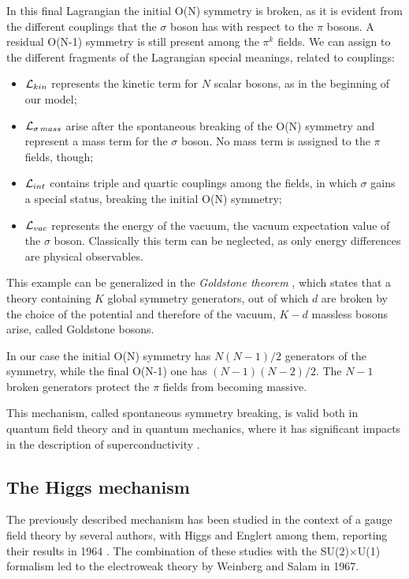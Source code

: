 In this final Lagrangian the initial O(N) symmetry is broken, as it is evident from the different couplings that the $\sigma$ boson has with respect to the $\pi$ bosons. A residual O(N-1) symmetry is still present among the $\pi^k$ fields.
We can assign to the different fragments of the Lagrangian special meanings, related to couplings:
\begin{itemize}
\item $\mathcal{L}_{kin}$ represents the kinetic term for $N$ scalar bosons, as in the beginning of our model;
\item $\mathcal{L}_{\sigma \, mass}$ arise after the spontaneous breaking of the O(N) symmetry and represent a mass term for the $\sigma$ boson. No mass term is assigned to the $\pi$ fields, though;
\item $\mathcal{L}_{int}$ contains triple and quartic couplings among the fields, in which $\sigma$ gains a special status, breaking the initial O(N) symmetry;
\item $\mathcal{L}_{vac}$ represents the energy of the vacuum, the vacuum expectation value of the $\sigma$ boson. Classically this term can be neglected, as only energy differences are physical observables.
\end{itemize}

This example can be generalized in the \emph{Goldstone theorem} \cite{1962PhRv..127..965G}, which states that a theory containing $K$ global symmetry generators, out of which $d$ are broken by the choice of the potential and therefore of the vacuum, $K - d$ massless bosons arise, called Goldstone bosons. 

In our case the initial O(N) symmetry has $N(N-1)/2$ generators of the symmetry, while the final O(N-1) one has $(N-1)(N-2)/2$. The $N-1$ broken generators protect the $\pi$ fields from becoming massive.

This mechanism, called spontaneous symmetry breaking, is valid both in quantum field theory and in quantum mechanics, where it has significant impacts in the description of superconductivity \cite{Nambu:1960tm}.

\subsection{The Higgs mechanism}

The previously described mechanism has been studied in the context of a gauge field theory by several authors, with Higgs and Englert among them, reporting their results in 1964 \cite{Englert:1964et, Higgs:1964ia}. The combination of these studies with the SU(2)$\times$U(1) formalism led to the electroweak theory by Weinberg and Salam in 1967.

